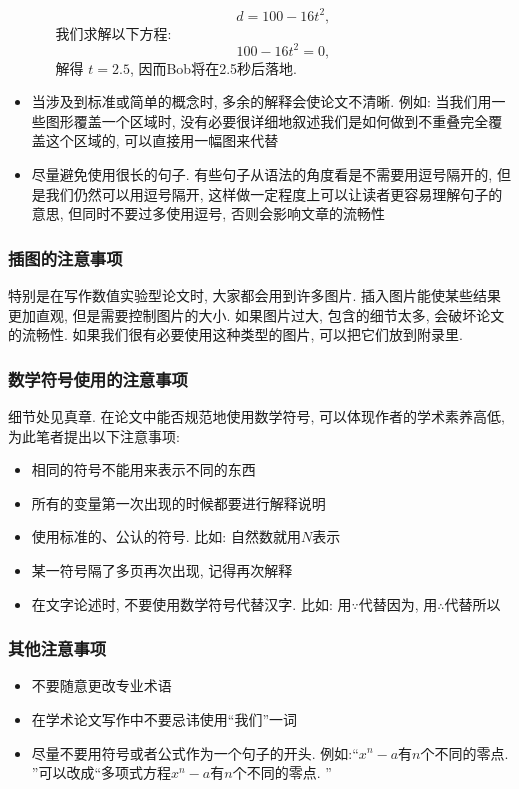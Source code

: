 \documentclass{formatBook}
\begin{document}
\begin{itemize}
\begin{enumerate}
\begin{equation*}
                        d = 100 − 16t^{2},
                    \end{equation*}
                    我们求解以下方程: 
                    \begin{equation*}
                        100 − 16t^{2} =0,
                    \end{equation*}
                    解得 $t =2.5$, 因而Bob将在2.5秒后落地. 
          \end{enumerate}
    \item 当涉及到标准或简单的概念时, 多余的解释会使论文不清晰. 例如: 当我们用一些图形覆盖一个区域时, 没有必要很详细地叙述我们是如何做到不重叠完全覆盖这个区域的, 可以直接用一幅图来代替
    \item 尽量避免使用很长的句子. 有些句子从语法的角度看是不需要用逗号隔开的, 但是我们仍然可以用逗号隔开, 这样做一定程度上可以让读者更容易理解句子的意思, 但同时不要过多使用逗号, 否则会影响文章的流畅性
\end{itemize}
\subsubsection{插图的注意事项}
特别是在写作数值实验型论文时, 大家都会用到许多图片. 插入图片能使某些结果更加直观, 但是需要控制图片的大小. 如果图片过大, 包含的细节太多, 会破坏论文的流畅性. 如果我们很有必要使用这种类型的图片, 可以把它们放到附录里. 
\subsubsection{数学符号使用的注意事项}
细节处见真章. 在论文中能否规范地使用数学符号, 可以体现作者的学术素养高低, 为此笔者提出以下注意事项: 
\begin{itemize}
    \item 相同的符号不能用来表示不同的东西
    \item 所有的变量第一次出现的时候都要进行解释说明
    \item 使用标准的、公认的符号. 比如: 自然数就用$N$表示
    \item 某一符号隔了多页再次出现, 记得再次解释
    \item 在文字论述时, 不要使用数学符号代替汉字. 比如: 用$\because$代替因为, 用$\therefore$代替所以
\end{itemize}
\subsubsection{其他注意事项}
\begin{itemize}
    \item 不要随意更改专业术语
    \item 在学术论文写作中不要忌讳使用“我们”一词
    \item 尽量不要用符号或者公式作为一个句子的开头. 例如:“$x^{n}-a$有$n$个不同的零点. ”可以改成“多项式方程$x^{n}-a$有$n$个不同的零点. ”
\end{itemize}
\end{document}
